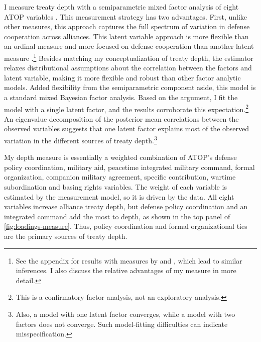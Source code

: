 \documentclass[12pt]{article}
\begin{document}
I measure treaty depth with a semiparametric mixed factor analysis of eight ATOP variables \citep{Murrayetal2013}.
This measurement strategy has two advantages. 
First, unlike other measures, this approach captures the full spectrum of variation in defense cooperation across alliances.
This latent variable approach is more flexible than an ordinal measure \citep{LeedsAnac2005} and more focused on defense cooperation than another latent measure \citep{BensonClinton2016}.\footnote{See the appendix for results with measures by \citet{LeedsAnac2005} and \citet{BensonClinton2016}, which lead to similar inferences. I also discuss the relative advantages of my measure in more detail.}
Besides matching my conceptualization of treaty depth, the estimator relaxes distributional assumptions about the correlation between the factors and latent variable, making it more flexible and robust than other factor analytic models. 
Added flexibility from the semiparametric component aside, this model is a standard mixed Bayesian factor analysis. 
Based on the argument, I fit the model with a single latent factor, and the results corroborate this expectation.\footnote{This is a confirmatory factor analysis, not an exploratory analysis.}
An eigenvalue decomposition of the posterior mean correlations between the observed variables suggests that one latent factor explains most of the observed variation in the different sources of treaty depth.\footnote{Also, a model with one latent factor converges, while a model with two factors does not converge. Such model-fitting difficulties can indicate misspecification.} 


My depth measure is essentially a weighted combination of ATOP's defense policy coordination, military aid, peacetime integrated military command, formal organization, companion military agreement, specific contribution, wartime subordination and basing rights variables.
The weight of each variable is estimated by the measurement model, so it is driven by the data.  
All eight variables increase alliance treaty depth, but defense policy coordination and an integrated command add the most to depth, as shown in the top panel of \autoref{fig:loadings-measure}. 
Thus, policy coordination and formal organizational ties are the primary sources of treaty depth. 
\end{document}
